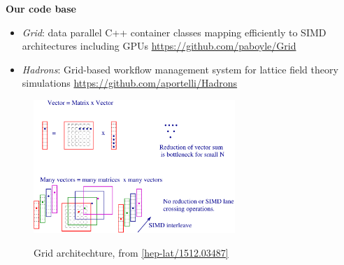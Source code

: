 \documentclass[english,xcolor=pst,11pt]{beamer}
\begin{document}
\begin{frame}
 \textbf{Our code base}
 \begin{itemize}
  \item \emph{Grid}: data parallel C++ container classes mapping efficiently to SIMD architectures including GPUs \url{https://github.com/paboyle/Grid}
  \item \emph{Hadrons}: Grid-based workflow management system for lattice field theory simulations \url{https://github.com/aportelli/Hadrons}
 \end{itemize}

 \begin{figure}[H]
	\centering
    {\includegraphics[width=3in]{diagrams/grid.pdf}}
    \caption{Grid architechture, from \url{[hep-lat/1512.03487]}}
\end{figure}
\end{frame}
\end{document}

